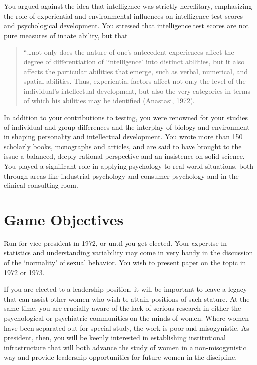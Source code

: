 \begin{refsection}
You argued against the idea that intelligence was strictly hereditary, emphasizing the role of experiential and environmental influences on intelligence test scores and psychological development. You stressed that intelligence test scores are not pure measures of innate ability, but that 

\begin{quote}

“{\ldots}not only does the nature of one's antecedent experiences affect the degree of differentiation of ‘intelligence’ into distinct abilities, but it also affects the particular abilities that emerge, such as verbal, numerical, and spatial abilities. Thus, experiential factors affect not only the level of the individual's intellectual development, but also the very categories in terms of which his abilities may be identified (Anastasi, 1972).
\end{quote}

In addition to your contributions to testing, you were renowned for your studies of individual and group differences and the interplay of biology and environment in shaping personality and intellectual development. You wrote more than 150 scholarly books, monographs and articles, and are said to have brought to the issue a balanced, deeply rational perspective and an insistence on solid science. You played a significant role in applying psychology to real-world situations, both through areas like industrial psychology and consumer psychology and in the clinical consulting room.

\section{Game Objectives}
\label{gameobjectives}

Run for vice president in 1972, or until you get elected. Your expertise in statistics and understanding variability may come in very handy in the discussion of the `normality' of sexual behavior. You wish to present paper on the topic in 1972 or 1973.

If you are elected to a leadership position, it will be important to leave a legacy that can assist other women who wish to attain positions of such stature. At the same time, you are crucially aware of the lack of serious research in either the psychological or psychiatric communities on the minds of women. Where women have been separated out for special study, the work is poor and misogynistic. As president, then, you will be keenly interested in establishing institutional infrastructure that will both advance the study of women in a non-misogynistic way and provide leadership opportunities for future women in the discipline.


\end{refsection}
